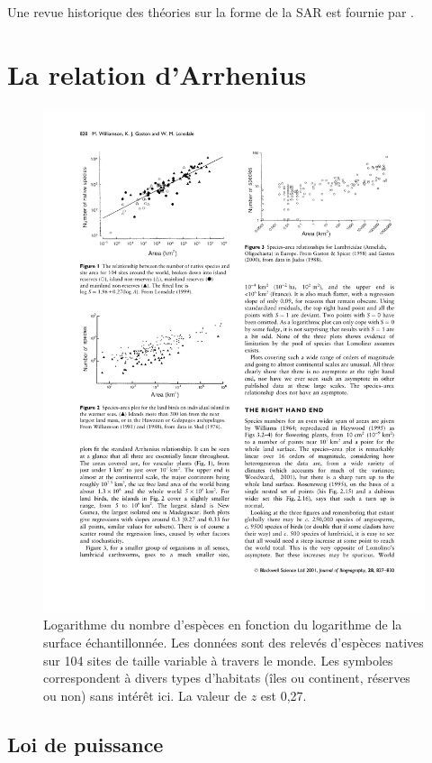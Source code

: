 \documentclass[
  11pt,
  french,
  a4paper,
  extrafontsizes,onecolumn,openright
  ]{memoir}
\newlength{\rf}
\begin{document}
Une revue historique des théories sur la forme de la SAR est fournie par \textcite{McGuinness1984}.

\hypertarget{sec:Arrhenius}{%
\section{La relation d'Arrhenius}\label{sec:Arrhenius}}



\scriptsize

\begin{figure}

{\centering \includegraphics[width=0.8\linewidth]{images/Williamson2001} 

}

\caption{Logarithme du nombre d'espèces en fonction du logarithme de la surface échantillonnée. Les données sont des relevés d'espèces natives sur 104 sites de taille variable à travers le monde. Les symboles correspondent à divers types d'habitats (îles ou continent, réserves ou non) sans intérêt ici. La valeur de \(z\) est 0,27.}\label{fig:Williamson2001}
\end{figure}

\normalsize

\hypertarget{loi-de-puissance}{%
\subsection{Loi de puissance}\label{loi-de-puissance}}
\end{document}
